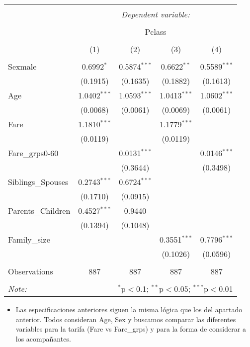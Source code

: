 \documentclass[
]{article}
\providecommand{\tightlist}{%
  \setlength{\itemsep}{0pt}\setlength{\parskip}{0pt}}
\begin{document}
\begingroup 
\scriptsize 
\begin{tabular}{@{\extracolsep{5pt}}lcccc} 
\\[-1.8ex]\hline 
\hline \\[-1.8ex] 
 & \multicolumn{4}{c}{\textit{Dependent variable:}} \\ 
\cline{2-5} 
\\[-1.8ex] & \multicolumn{4}{c}{Pclass} \\ 
\\[-1.8ex] & (1) & (2) & (3) & (4)\\ 
\hline \\[-1.8ex] 
 Sexmale & 0.6992$^{*}$ & 0.5874$^{***}$ & 0.6622$^{**}$ & 0.5589$^{***}$ \\ 
  & (0.1915) & (0.1635) & (0.1882) & (0.1613) \\ 
  Age & 1.0402$^{***}$ & 1.0593$^{***}$ & 1.0413$^{***}$ & 1.0602$^{***}$ \\ 
  & (0.0068) & (0.0061) & (0.0069) & (0.0061) \\ 
  Fare & 1.1810$^{***}$ &  & 1.1779$^{***}$ &  \\ 
  & (0.0119) &  & (0.0119) &  \\ 
  Fare\_grps0-60 &  & 0.0131$^{***}$ &  & 0.0146$^{***}$ \\ 
  &  & (0.3644) &  & (0.3498) \\ 
  Siblings\_Spouses & 0.2743$^{***}$ & 0.6724$^{***}$ &  &  \\ 
  & (0.1710) & (0.0915) &  &  \\ 
  Parents\_Children & 0.4527$^{***}$ & 0.9440 &  &  \\ 
  & (0.1394) & (0.1048) &  &  \\ 
  Family\_size &  &  & 0.3551$^{***}$ & 0.7796$^{***}$ \\ 
  &  &  & (0.1026) & (0.0596) \\ 
 \hline \\[-1.8ex] 
Observations & 887 & 887 & 887 & 887 \\ 
\hline 
\hline \\[-1.8ex] 
\textit{Note:}  & \multicolumn{4}{r}{$^{*}$p$<$0.1; $^{**}$p$<$0.05; $^{***}$p$<$0.01} \\ 
\end{tabular} 
\endgroup

\begin{itemize}
\tightlist
\item
  Las especificaciones anteriores siguen la misma lógica que los del
  apartado anterior. Todos consideran Age, Sex y buscamos comparar las
  diferentes variables para la tarifa (Fare vs Fare\_grps) y para la
  forma de considerar a los acompañantes.
\end{itemize}
\end{document}
